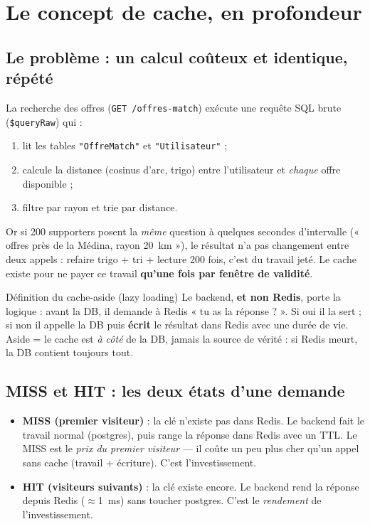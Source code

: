 \documentclass[11pt,a4paper]{article}
\begin{document}
\section{Le concept de cache, en profondeur}

\subsection{Le problème : un calcul coûteux et identique, répété}

La recherche des offres (\texttt{GET /offres-match}) exécute une requête SQL
brute (\texttt{\$queryRaw}) qui :
\begin{enumerate}[nosep]
  \item lit les tables \texttt{"OffreMatch"} et \texttt{"Utilisateur"} ;
  \item calcule la distance (cosinus d'arc, trigo) entre l'utilisateur et
        \emph{chaque} offre disponible ;
  \item filtre par rayon et trie par distance.
\end{enumerate}

Or si 200 supporters posent la \emph{même} question à quelques secondes
d'intervalle (« offres près de la Médina, rayon 20~km »), le résultat n'a pas
changement entre deux appels : refaire trigo + tri + lecture 200 fois, c'est
du travail jeté. Le cache existe pour ne payer ce travail
\textbf{qu'une fois par fenêtre de validité}.

\begin{conceptbox}{Définition du cache-aside (lazy loading)}
Le backend, \textbf{et non Redis}, porte la logique : avant la DB, il demande à Redis
« tu as la réponse ? ». Si oui il la sert ; si non il appelle la DB puis
\textbf{écrit} le résultat dans Redis avec une durée de vie.
\og Aside \fg{} = le cache est \emph{à côté} de la DB, jamais la source de
vérité : si Redis meurt, la DB contient toujours tout.
\end{conceptbox}

\subsection{MISS et HIT : les deux états d'une demande}

\begin{itemize}
  \item \textbf{MISS (premier visiteur)} : la clé n'existe pas dans Redis.
        Le backend fait le travail normal (postgres), puis range la réponse
        dans Redis avec un TTL. Le MISS est le \emph{prix du premier visiteur}
        --- il coûte un peu plus cher qu'un appel sans cache
        (travail + écriture). C'est l'investissement.
  \item \textbf{HIT (visiteurs suivants)} : la clé existe encore. Le backend
        rend la réponse depuis Redis ($\approx$1~ms) sans toucher postgres.
        C'est le \emph{rendement} de l'investissement.
\end{itemize}
\end{document}
